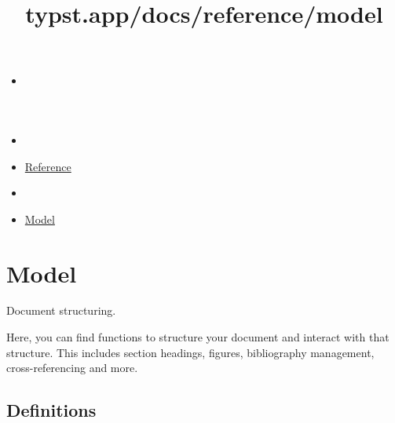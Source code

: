 \title{typst.app/docs/reference/model}

\begin{itemize}
\tightlist
\item
  \href{/docs}{}
\item
  
\item
  \href{/docs/reference/}{Reference}
\item
  
\item
  \href{/docs/reference/model/}{Model}
\end{itemize}

\section{Model}\label{summary}

Document structuring.

Here, you can find functions to structure your document and interact
with that structure. This includes section headings, figures,
bibliography management, cross-referencing and more.

\subsection{Definitions}\label{definitions}

